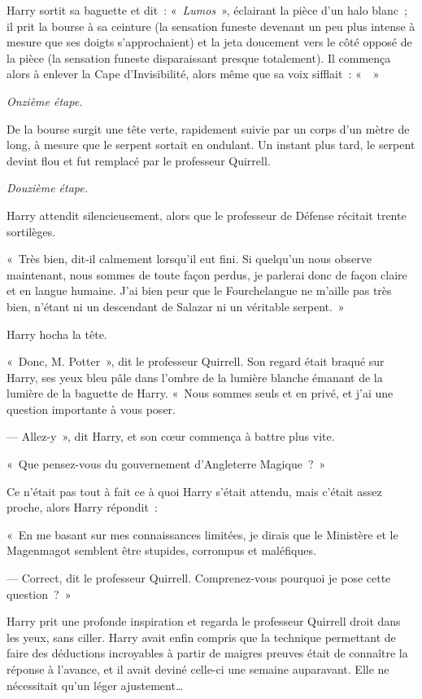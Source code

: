 Harry sortit sa baguette et dit~: «~\emph{Lumos}~», éclairant la pièce d'un halo blanc~; il prit la bourse à sa ceinture (la sensation funeste devenant un peu plus intense à mesure que ses doigts s'approchaient) et la jeta doucement vers le côté opposé de la pièce (la sensation funeste disparaissant presque totalement).
Il commença alors à enlever la Cape d'Invisibilité, alors même que sa voix sifflait~: «~~»

\emph{Onzième étape.}

De la bourse surgit une tête verte, rapidement suivie par un corps d'un mètre de long, à mesure que le serpent sortait en ondulant.
Un instant plus tard, le serpent devint flou et fut remplacé par le professeur Quirrell.

\emph{Douzième étape.}

Harry attendit silencieusement, alors que le professeur de Défense récitait trente sortilèges.

«~Très bien, dit-il calmement lorsqu'il eut fini.
Si quelqu'un nous observe maintenant, nous sommes de toute façon perdus, je parlerai donc de façon claire et en langue humaine.
J'ai bien peur que le Fourchelangue ne m'aille pas très bien, n'étant ni un descendant de Salazar ni un véritable serpent.~»

Harry hocha la tête.

«~Donc, M. Potter~», dit le professeur Quirrell.
Son regard était braqué sur Harry, ses yeux bleu pâle dans l'ombre de la lumière blanche émanant de la lumière de la baguette de Harry.
«~Nous sommes seuls et en privé, et j'ai une question importante à vous poser.

--- Allez-y~», dit Harry, et son cœur commença à battre plus vite.

«~Que pensez-vous du gouvernement d'Angleterre Magique~?~»

Ce n'était pas tout à fait ce à quoi Harry s'était attendu, mais c'était assez proche, alors Harry répondit~:

«~En me basant sur mes connaissances limitées, je dirais que le Ministère et le Magenmagot semblent être stupides, corrompus et maléfiques.

--- Correct, dit le professeur Quirrell.
Comprenez-vous pourquoi je pose cette question~?~»

Harry prit une profonde inspiration et regarda le professeur Quirrell droit dans les yeux, sans ciller.
Harry avait enfin compris que la technique permettant de faire des déductions incroyables à partir de maigres preuves était de connaître la réponse à l'avance, et il avait deviné celle-ci une semaine auparavant.
Elle ne nécessitait qu'un léger ajustement…

